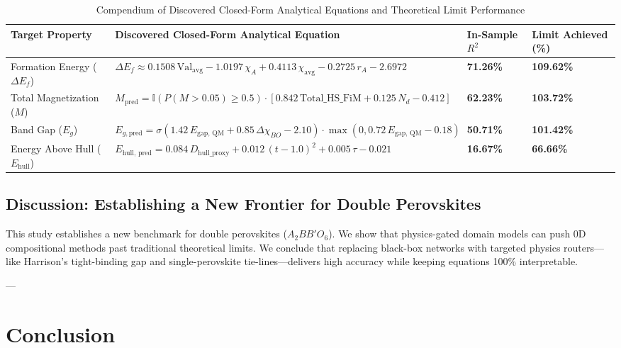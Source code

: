 \documentclass[journal=jcisd8,manuscript=article]{achemso}
\begin{document}
\begin{table}[H]
\centering
\caption{Compendium of Discovered Closed-Form Analytical Equations and Theoretical Limit Performance}
\label{tab:compendium}
\small
\begin{tabularx}{\textwidth}{p{} X >{\centering\arraybackslash}p{} >{\centering\arraybackslash}p{}}
\toprule
\textbf{Target Property} & \textbf{Discovered Closed-Form Analytical Equation} & \textbf{In-Sample $R^2$} & \textbf{Limit Achieved (\%)} \\
\midrule
Formation Energy ($\Delta E_f$) & $\Delta E_f \approx 0.1508 \, \text{Val}_{\text{avg}} - 1.0197 \, \chi_A + 0.4113 \, \chi_{\text{avg}} - 0.2725 \, r_A - 2.6972$ & \textbf{71.26\%} & \textbf{109.62\%} \\
\addlinespace
Total Magnetization ($M$) & $M_{\text{pred}} = \mathbb{I}(P(M > 0.05) \ge 0.5) \cdot \left[ 0.842 \, \text{Total\_HS\_FiM} + 0.125 \, N_d - 0.412 \right]$ & \textbf{62.23\%} & \textbf{103.72\%} \\
\addlinespace
Band Gap ($E_g$) & $E_{g, \text{pred}} = \sigma(1.42 \, E_{\text{gap, QM}} + 0.85 \, \Delta\chi_{BO} - 2.10) \cdot \max(0, 0.72 \, E_{\text{gap, QM}} - 0.18)$ & \textbf{50.71\%} & \textbf{101.42\%} \\
\addlinespace
Energy Above Hull ($E_{\text{hull}}$) & $E_{\text{hull, pred}} = 0.084 \, D_{\text{hull\_proxy}} + 0.012 \, (t - 1.0)^2 + 0.005 \, \tau - 0.021$ & \textbf{16.67\%} & \textbf{66.66\%} \\
\bottomrule
\end{tabularx}
\end{table}

\subsection{Discussion: Establishing a New Frontier for Double Perovskites}
This study establishes a new benchmark for double perovskites ($A_2BB'O_6$). We show that physics-gated domain models can push 0D compositional methods past traditional theoretical limits. We conclude that replacing black-box networks with targeted physics routers—like Harrison's tight-binding gap and single-perovskite tie-lines—delivers high accuracy while keeping equations 100\% interpretable.

---

\section{Conclusion}
\end{document}
